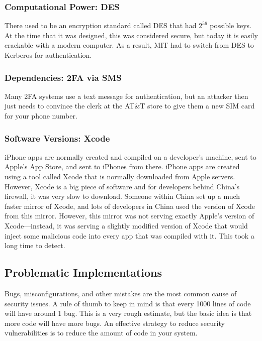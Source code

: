 \subsubsection{Computational Power: DES}
There used to be an encryption standard called DES that had $2^{56}$ possible keys. At the time that it was designed, this was considered secure, but today it is easily crackable with a modern computer. As a result, MIT had to switch from DES to Kerberos for authentication.

\subsubsection{Dependencies: 2FA via SMS}
Many 2FA systems use a text message for authentication, but an attacker then just needs to convince the clerk at the AT\&T store to give them a new SIM card for your phone number.

\subsubsection{Software Versions: Xcode}
iPhone apps are normally created and compiled on a developer's machine, sent to Apple's App Store, and sent to iPhones from there. iPhone apps are created using a tool called Xcode that is normally downloaded from Apple servers. However, Xcode is a big piece of software and for developers behind China's firewall, it was very slow to download. Someone within China set up a much faster mirror of Xcode, and lots of developers in China used the version of Xcode from this mirror. However, this mirror was not serving exactly Apple's version of Xcode---instead, it was serving a slightly modified version of Xcode that would inject some malicious code into every app that was compiled with it. This took a long time to detect. 

\subsection{Problematic Implementations}
Bugs, misconfigurations, and other mistakes are the most common cause of security issues. A rule of thumb to keep in mind is that every 1000 lines of code will have around 1 bug. This is a very rough estimate, but the basic idea is that more code will have more bugs. An effective strategy to reduce security vulnerabilities is to reduce the amount of code in your system.

